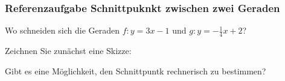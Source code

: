 \subsubsection{Referenzaufgabe Schnittpuknkt zwischen zwei Geraden}

Wo schneiden sich die Geraden $f: y=3x - 1$ und $g: y=-\frac{1}{4}x +
2$?

Zeichnen Sie zunächst eine Skizze:



Gibt es eine Möglichkeit, den Schnittpuntk rechnerisch zu bestimmen?

\newpage


